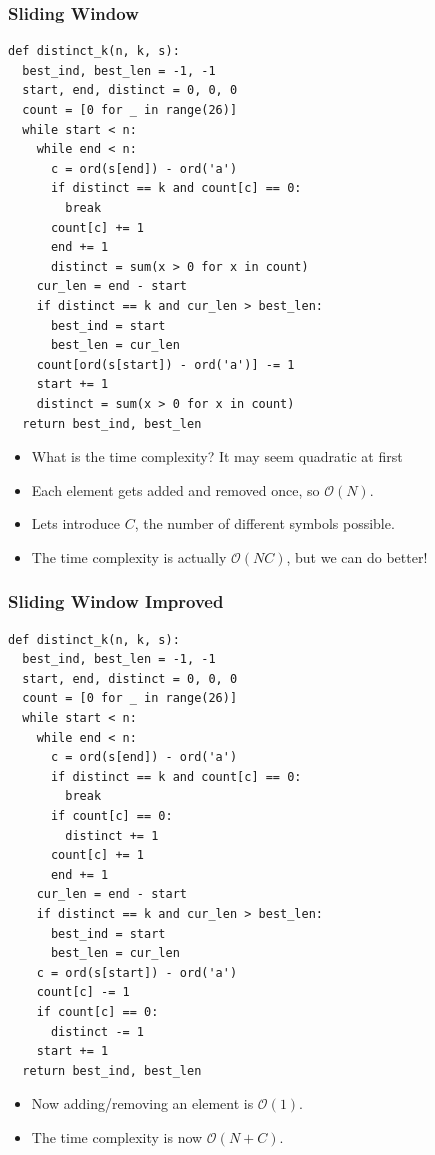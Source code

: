 \documentclass{beamer}
\begin{document}
\begin{frame}
    \frametitle{Sliding Window}
	\begin{tiny}
        \begin{verbatim}
def distinct_k(n, k, s):
  best_ind, best_len = -1, -1
  start, end, distinct = 0, 0, 0
  count = [0 for _ in range(26)]
  while start < n:
    while end < n:
      c = ord(s[end]) - ord('a')
      if distinct == k and count[c] == 0:
        break
      count[c] += 1
      end += 1
      distinct = sum(x > 0 for x in count)
    cur_len = end - start
    if distinct == k and cur_len > best_len:
      best_ind = start
      best_len = cur_len
    count[ord(s[start]) - ord('a')] -= 1
    start += 1
    distinct = sum(x > 0 for x in count)
  return best_ind, best_len
        \end{verbatim}
    \end{tiny}
    \vspace*{-0.3cm}
    \begin{itemize}
        \item<1-> What is the time complexity?  { It may seem quadratic at first}
        \item<3-> Each element gets added and removed once, so $\mathcal{O}(N)$.
        \item<4-> Lets introduce $C$, the number of different symbols possible.
        \item<4-> The time complexity is actually $\mathcal{O}(NC)$, but we can do better!
    \end{itemize}
\end{frame}


\begin{frame}
    \frametitle{Sliding Window Improved}
	\begin{tiny}
        \begin{verbatim}
def distinct_k(n, k, s):
  best_ind, best_len = -1, -1
  start, end, distinct = 0, 0, 0
  count = [0 for _ in range(26)]
  while start < n:
    while end < n:
      c = ord(s[end]) - ord('a')
      if distinct == k and count[c] == 0:
        break
      if count[c] == 0:
        distinct += 1
      count[c] += 1
      end += 1
    cur_len = end - start
    if distinct == k and cur_len > best_len:
      best_ind = start
      best_len = cur_len
    c = ord(s[start]) - ord('a')
    count[c] -= 1
    if count[c] == 0:
      distinct -= 1
    start += 1
  return best_ind, best_len
        \end{verbatim}
    \end{tiny}
    \begin{itemize}
        \item<2-> Now adding/removing an element is $\mathcal{O}(1)$.
        \item<2-> The time complexity is now $\mathcal{O}(N + C)$.
    \end{itemize}
\end{frame}
\end{document}
